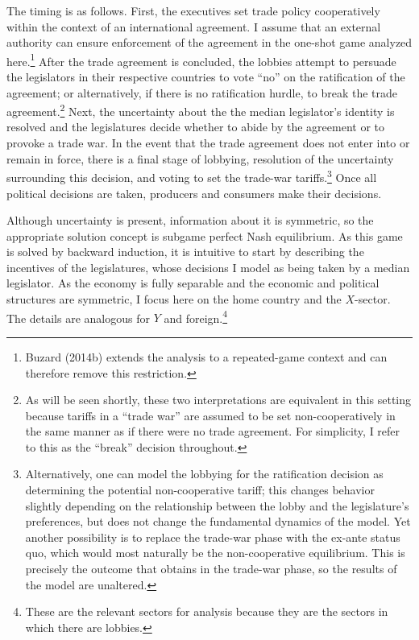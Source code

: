 \documentclass[10pt]{article}
\begin{document}
The timing is as follows. First, the executives set trade policy cooperatively within the context of an international agreement. I assume that an external authority can ensure enforcement of the agreement in the one-shot game analyzed here.\footnote{Buzard (2014b) extends the analysis to a repeated-game context and can therefore remove this restriction.} After the trade agreement is concluded, the lobbies attempt to persuade the legislators in their respective countries to vote ``no'' on the ratification of the agreement; or alternatively, if there is no ratification hurdle, to break the trade agreement.\footnote{As will be seen shortly, these two interpretations are equivalent in this setting because tariffs in a ``trade war'' are assumed to be set non-cooperatively in the same manner as if there were no trade agreement. For simplicity, I refer to this as the ``break'' decision throughout.} Next, the uncertainty about the the median legislator's identity is resolved and the legislatures decide whether to abide by the agreement or to provoke a trade war. In the event that the trade agreement does not enter into or remain in force, there is a final stage of lobbying, resolution of the uncertainty surrounding this decision, and voting to set the trade-war tariffs.\footnote{Alternatively, one can model the lobbying for the ratification decision as determining the potential non-cooperative tariff; this changes behavior slightly depending on the relationship between the lobby and the legislature's preferences, but does not change the fundamental dynamics of the model. Yet another possibility is to replace the trade-war phase with the ex-ante status quo, which would most naturally be the non-cooperative equilibrium. This is precisely the outcome that obtains in the trade-war phase, so the results of the model are unaltered.} Once all political decisions are taken, producers and consumers make their decisions.

Although uncertainty is present, information about it is symmetric, so the appropriate solution concept is subgame perfect Nash equilibrium. As this game is solved by backward induction, it is intuitive to start by describing the incentives of the legislatures, whose decisions I model as being taken by a median legislator. As the economy is fully separable and the economic and political structures are symmetric, I focus here on the home country and the $X$-sector. The details are analogous for $Y$ and foreign.\footnote{These are the relevant sectors for analysis because they are the sectors in which there are lobbies.}
\end{document}
